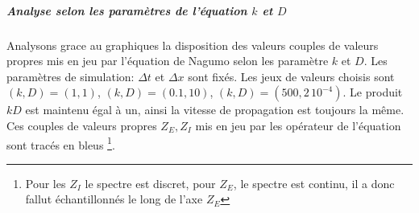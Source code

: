             \subparagraph{Analyse selon les paramètres de l'équation $k$ et $D$}
                Analysons grace au graphiques  la disposition des valeurs couples de valeurs 
                propres mis en jeu par l'équation de Nagumo selon les paramètre $k$ et $D$. Les paramètres de simulation: $\Delta t$ et $\Delta x$ sont fixés.
                Les jeux de valeurs choisis sont $(k,D)=(1,1)$, $(k,D)=(0.1,10)$, $(k,D)=(500,2\, 10^{-4})$. 
                Le produit $kD$ est maintenu égal à un, ainsi la vitesse de propagation est toujours la même.
                Ces couples de valeurs propres $Z_E,Z_I$ mis en jeu par les opérateur de l'équation sont tracés en bleus
                \footnote{Pour les $Z_I$ le spectre est discret, pour $Z_E$, le spectre est continu, il a donc fallut échantillonnés le long de l'axe $Z_E$}.

